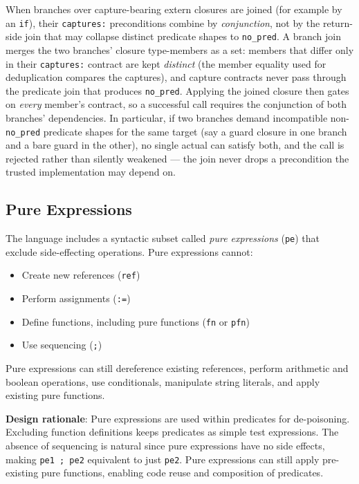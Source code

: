 \documentclass[12pt]{article}
\begin{document}
When branches over capture-bearing extern closures are joined (for example by an
\texttt{if}), their \texttt{captures:} preconditions combine by
\emph{conjunction}, not by the return-side join that may collapse distinct
predicate shapes to \texttt{no\_pred}. A branch join merges the two branches'
closure type-members as a set: members that differ only in their
\texttt{captures:} contract are kept \emph{distinct} (the member equality used for
deduplication compares the captures), and capture contracts never pass through the
predicate join that produces \texttt{no\_pred}. Applying the joined closure then
gates on \emph{every} member's contract, so a successful call requires the
conjunction of both branches' dependencies. In particular, if two branches demand
incompatible non-\texttt{no\_pred} predicate shapes for the same target (say a
guard closure in one branch and a bare guard in the other), no single actual can
satisfy both, and the call is rejected rather than silently weakened --- the join
never drops a precondition the trusted implementation may depend on.

\subsection{Pure Expressions}

The language includes a syntactic subset called \emph{pure expressions} (\texttt{pe}) that exclude side-effecting operations. Pure expressions cannot:
\begin{itemize}
    \item Create new references (\texttt{ref})
    \item Perform assignments (\texttt{:=})
    \item Define functions, including pure functions (\texttt{fn} or \texttt{pfn})
    \item Use sequencing (\texttt{;})
\end{itemize}

Pure expressions can still dereference existing references, perform arithmetic and
boolean operations, use conditionals, manipulate string literals, and apply
existing pure functions.

\textbf{Design rationale}: Pure expressions are used within predicates for
de-poisoning. Excluding function definitions keeps predicates as simple
test expressions. The absence of sequencing is natural since pure expressions have
no side effects, making \texttt{pe1 ; pe2} equivalent to just \texttt{pe2}.
Pure expressions can still apply pre-existing pure functions, enabling code
reuse and composition of predicates.
\end{document}

